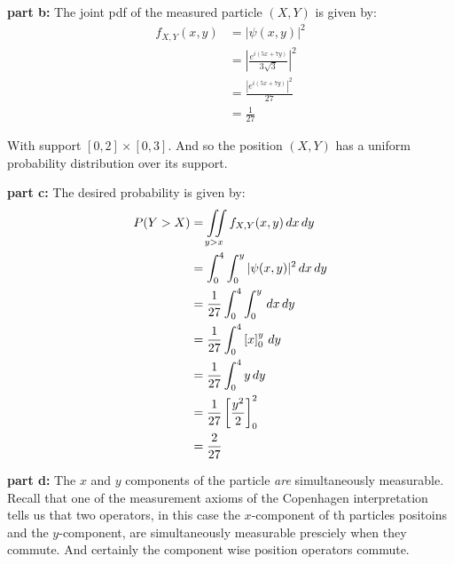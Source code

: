 \documentclass{article}
\renewcommand{\eval}[3]{\left[#1\right]_{#2}^{#3}}
\begin{document}
\noindent\textbf{part b:} The joint pdf of the measured particle $(X,Y)$ is given by:
\begin{align*}
    f_{X,Y}(x,y)&=|\psi(x,y)|^2\\
    &=\left|\frac{e^{i(5x+7y)}}{3\sqrt 3}\right|^2\\
    &=\frac{\left|e^{i(5x+7y)}\right|^2}{27}\\
    &=\frac{1}{27}\tag{lemma 1}
\end{align*}

With support $[0,2]\times[0,3]$. And so the position $(X,Y)$ has a uniform probability distribution over its support.
\bigskip

\noindent\textbf{part c:} The desired probability is given by:
\begin{align*}
    P(Y>X)&=\iint\displaylimits_{y>x}f_{X,Y}(x,y)\,dx\,dy\\
    &=\int_0^4\int_0^y|\psi(x,y)|^2\,dx\,dy\\
    &=\frac{1}{27}\int_0^4\int_0^y\,dx\,dy\\
    &=\frac{1}{27}\int_0^4\eval{x}{0}{y}\,dy\\
    &=\frac{1}{27}\int_0^4y\,dy\\
    &=\frac{1}{27}\eval{\frac{y^2}{2}}{0}{2}\\
    &=\frac{2}{27}
\end{align*}
\bigskip

\noindent\textbf{part d:} The $x$ and $y$ components of the particle \textit{are} simultaneously measurable. Recall that one of the measurement axioms of the Copenhagen interpretation tells us that two operators, in this case the $x$-component of th particles positoins and the $y$-component, are simultaneously measurable presciely when they commute. And certainly the component wise position operators commute.

\end{document}
